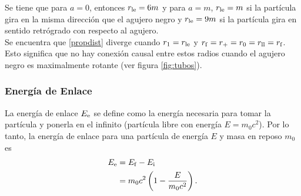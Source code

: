 Se tiene que para $a=0$, entonces $r_{\rm le}=6m$ y para $a=m$, $r_{\rm le}=m$ si la part\'icula gira en la misma direcci\'on que el agujero negro y $r_{\rm le}=9m$ si la part\'icula gira en sentido retr\'ogrado con respecto al agujero.\\

%


Se encuentra que \eqref{propdist} diverge cuando $r_1=r_{\rm le}$ y $r_{\rm f}=r_{\rm +}=r_{0}=r_{\rm ll}=r_{\rm f}$. Esto significa que no hay conexi\'on causal entre estos radios cuando el agujero negro es maximalmente rotante (ver figura \ref{fig:tubos}).

\subsubsection{Energ\'ia de Enlace}

La energ\'ia de enlace $E_{\rm e}$ se define como la energ\'ia necesaria para tomar la part\'icula y ponerla en el infinito (part\'icula libre con energ\'ia $E=m_0c^2$). Por lo tanto, la energ\'ia de enlace para una part\'icula de energ\'ia $E$ y masa en reposo $m_0$ es
 \begin{equation}
 \begin{aligned}
 E_{\rm e}&=E_{\rm f}-E_{\rm i}\\
 &=m_0c^2\left(1-\frac{E}{m_0c^2}\right).
 \end{aligned}
 \end{equation}
 
